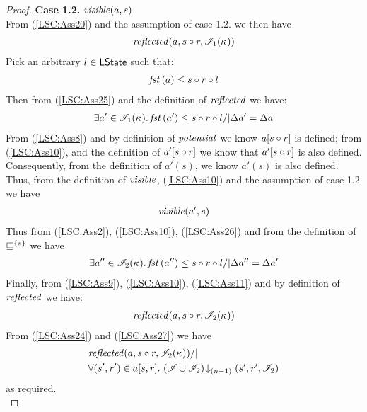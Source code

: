 \begin{lemma}
\begin{proof}
\noindent\textbf{Case 1.2. } $\mathit{visible}(a, s)$\\
From (\ref{LSC:Ass20}) and the assumption of case 1.2. we then have
%
\begin{align}
	\mathit{reflected}(a, s \circ r, \mathscr{I}_1(\kappa_{}))
	\label{LSC:Ass25}
\end{align}
%
Pick an arbitrary $l \in \textsf{LState}$ such that:
%
\begin{align}
	\mathit{fst}\left(a\right) \leq s \circ r \circ l \label{LSC:Ass9}
\end{align}
%
Then from (\ref{LSC:Ass25}) and the definition of $\mathit{reflected}$ we have:
\begin{align}
	\exists a' \in \mathscr{I}_1(\kappa_{}).\, \mathit{fst}\left(a'\right) \leq s \circ r \circ l /| \Delta {a'} = \Delta {a} \label{LSC:Ass10}
\end{align}
From (\ref{LSC:Ass8}) and by definition of $\mathit{potential}$ we know $a[s \circ r]$ is defined; from (\ref{LSC:Ass10}), and the definition of $a'[s \circ r]$ we know that $a'[s \circ r]$ is also defined. Consequently, from the definition of $a'(s)$, we know $a'(s)$ is also defined. Thus, from the definition of $\mathit{visible}$, (\ref{LSC:Ass10}) and the assumption of case 1.2 we have 
%
\begin{align}
	\mathit{visible}(a', s)
	\label{LSC:Ass26}
\end{align}
%
Thus from (\ref{LSC:Ass2}), (\ref{LSC:Ass10}), (\ref{LSC:Ass26}) and from the definition of $\sqsubseteq^{\{s\}}$ we have 
%
\begin{align}
	\exists a'' \in \mathscr{I}_2(\kappa_{}).\, \mathit{fst}\left(a''\right) \leq s \circ r \circ l /| \Delta {a''} = \Delta {a'} \label{LSC:Ass11}
\end{align} 
%
Finally, from (\ref{LSC:Ass9}), (\ref{LSC:Ass10}), (\ref{LSC:Ass11}) and by definition of $\mathit{reflected}$ we have:
%
\begin{align}
	\mathit{reflected}(a, s \circ r, \mathscr{I}_2(\kappa_{}))
	\label{LSC:Ass27}
\end{align} 
%
From (\ref{LSC:Ass24}) and (\ref{LSC:Ass27}) we have
\begin{align*}
	&\mathit{reflected}(a, s \circ r, \mathscr{I}_2(\kappa_{})) /| \\
	&\forall (s', r') \in a[s, r].\, \left(\mathscr{I} \cup \mathscr{I}_2\right) \!\downarrow_{(n-1)} \left(s', r', \mathscr{I}_2\right)
\end{align*}
%
as required.\\
%
%
%
%


\end{proof}
\end{lemma}
